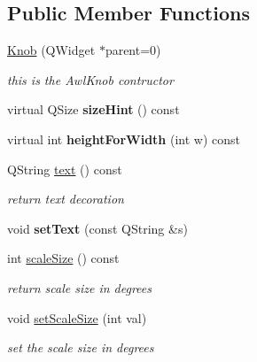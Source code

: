 \subsection*{Public Member Functions}
\begin{DoxyCompactItemize}
\item 
\mbox{\label{class_awl_1_1_knob_a196d8e2cee633acd9052bb9de3ee4078}} 
\hyperlink{class_awl_1_1_knob_a196d8e2cee633acd9052bb9de3ee4078}{Knob} (Q\+Widget $\ast$parent=0)
\begin{DoxyCompactList}\small\item\em this is the Awl\+Knob contructor \end{DoxyCompactList}\item 
\mbox{\label{class_awl_1_1_knob_a35800c049049196d32c166dda00f392f}} 
virtual Q\+Size {\bfseries size\+Hint} () const
\item 
\mbox{\label{class_awl_1_1_knob_a005eb5e216011804dcb457835e02ecfa}} 
virtual int {\bfseries height\+For\+Width} (int w) const
\item 
\mbox{\label{class_awl_1_1_knob_a74828b62861f2416aab0c62cf5bc63e5}} 
Q\+String \hyperlink{class_awl_1_1_knob_a74828b62861f2416aab0c62cf5bc63e5}{text} () const
\begin{DoxyCompactList}\small\item\em return text decoration \end{DoxyCompactList}\item 
\mbox{\label{class_awl_1_1_knob_a5365dfde333ac7aaf3dcdef2d6440b43}} 
void {\bfseries set\+Text} (const Q\+String \&s)
\item 
\mbox{\label{class_awl_1_1_knob_a4e10262b15112122eea6a3cfa6675a81}} 
int \hyperlink{class_awl_1_1_knob_a4e10262b15112122eea6a3cfa6675a81}{scale\+Size} () const
\begin{DoxyCompactList}\small\item\em return scale size in degrees \end{DoxyCompactList}\item 
void \hyperlink{class_awl_1_1_knob_aa8d7f92cc7ebfb1a2026e9cf5e47bd6d}{set\+Scale\+Size} (int val)
\begin{DoxyCompactList}\small\item\em set the scale size in degrees \end{DoxyCompactList}\item 

\end{DoxyCompactItemize}
